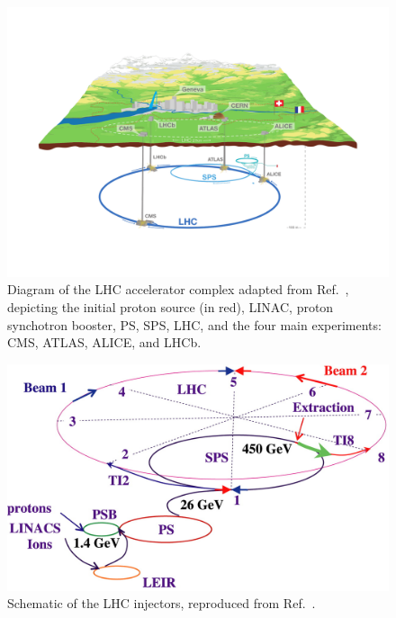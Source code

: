 \begin{figure}[ht]
    \centering
    \includegraphics[trim=0pt 80pt 0pt 150pt, width=\textwidth]{figures/02-CMS/lhc/LHC_overall.pdf}
    \caption{Diagram of the LHC accelerator complex adapted from Ref.~\cite{Mouche:1708847}, depicting the initial proton source (in red), LINAC, proton synchotron booster, PS, SPS, LHC, and the four main experiments: CMS, ATLAS, ALICE, and LHCb.}
    \label{fig:02_lhc_accelerator}
\end{figure}

\begin{figure}[ht]
    \centering
    \captionsetup{justification=centering}
    \includegraphics[width=\textwidth]{figures/02-CMS/lhc/lhc_injectors.jpg}
    \caption{Schematic of the LHC injectors, reproduced from Ref.~\cite{Bruning:2012zz}.}
    \label{fig:02_lhc_injectors}
\end{figure}

